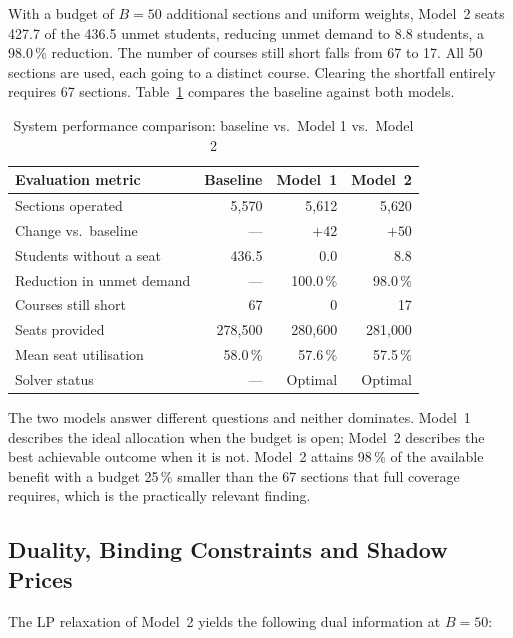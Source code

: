 \documentclass[conference]{IEEEtran}
\begin{document}
With a budget of $B = 50$ additional sections and uniform weights, Model~2 seats 427.7
of the 436.5 unmet students, reducing unmet demand to 8.8 students, a 98.0\,\%
reduction. The number of courses still short falls from 67 to 17. All 50 sections are
used, each going to a distinct course. Clearing the shortfall entirely requires 67
sections. Table~\ref{tab:compare} compares the baseline against both models.

\begin{table}[htbp]
\caption{System performance comparison: baseline vs.\ Model 1 vs.\ Model 2}
\label{tab:compare}
\centering
\small
\begin{tabular}{lrrr}
\toprule
Evaluation metric & Baseline & Model~1 & Model~2 \\
\midrule
Sections operated        & 5{,}570 & 5{,}612 & 5{,}620 \\
Change vs.\ baseline     & ---     & $+42$   & $+50$ \\
Students without a seat  & 436.5   & 0.0     & 8.8 \\
Reduction in unmet demand& ---     & 100.0\,\% & 98.0\,\% \\
Courses still short      & 67      & 0       & 17 \\
Seats provided           & 278{,}500 & 280{,}600 & 281{,}000 \\
Mean seat utilisation    & 58.0\,\% & 57.6\,\% & 57.5\,\% \\
Solver status            & ---     & Optimal & Optimal \\
\bottomrule
\end{tabular}
\end{table}

The two models answer different questions and neither dominates. Model~1 describes the
ideal allocation when the budget is open; Model~2 describes the best achievable outcome
when it is not. Model~2 attains 98\,\% of the available benefit with a budget 25\,\%
smaller than the 67 sections that full coverage requires, which is the practically
relevant finding.

\subsection{Duality, Binding Constraints and Shadow Prices}

The LP relaxation of Model~2 yields the following dual information at $B = 50$:
\end{document}
